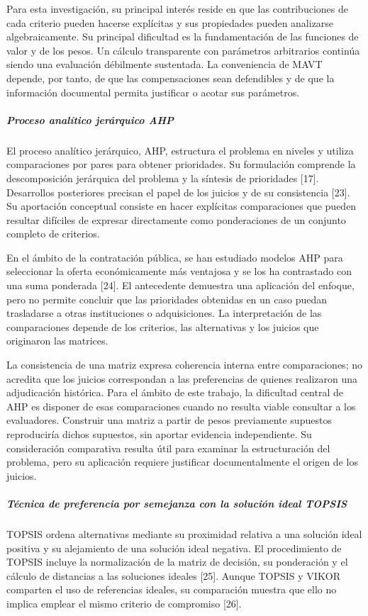 \documentclass[12pt,a4paper]{article}
\begin{document}
Para esta investigación, su principal interés reside en que las contribuciones de cada criterio pueden hacerse explícitas y sus propiedades pueden analizarse algebraicamente. Su principal dificultad es la fundamentación de las funciones de valor y de los pesos. Un cálculo transparente con parámetros arbitrarios continúa siendo una evaluación débilmente sustentada. La conveniencia de MAVT depende, por tanto, de que las compensaciones sean defendibles y de que la información documental permita justificar o acotar sus parámetros.

\subparagraph{Proceso analítico jerárquico AHP}

El proceso analítico jerárquico, AHP, estructura el problema en niveles y utiliza comparaciones por pares para obtener prioridades. Su formulación comprende la descomposición jerárquica del problema y la síntesis de prioridades [17]. Desarrollos posteriores precisan el papel de los juicios y de su consistencia [23]. Su aportación conceptual consiste en hacer explícitas comparaciones que pueden resultar difíciles de expresar directamente como ponderaciones de un conjunto completo de criterios.

En el ámbito de la contratación pública, se han estudiado modelos AHP para seleccionar la oferta económicamente más ventajosa y se los ha contrastado con una suma ponderada [24]. El antecedente demuestra una aplicación del enfoque, pero no permite concluir que las prioridades obtenidas en un caso puedan trasladarse a otras instituciones o adquisiciones. La interpretación de las comparaciones depende de los criterios, las alternativas y los juicios que originaron las matrices.

La consistencia de una matriz expresa coherencia interna entre comparaciones; no acredita que los juicios correspondan a las preferencias de quienes realizaron una adjudicación histórica. Para el ámbito de este trabajo, la dificultad central de AHP es disponer de esas comparaciones cuando no resulta viable consultar a los evaluadores. Construir una matriz a partir de pesos previamente supuestos reproduciría dichos supuestos, sin aportar evidencia independiente. Su consideración comparativa resulta útil para examinar la estructuración del problema, pero su aplicación requiere justificar documentalmente el origen de los juicios.

\subparagraph{Técnica de preferencia por semejanza con la solución ideal TOPSIS}

TOPSIS ordena alternativas mediante su proximidad relativa a una solución ideal positiva y su alejamiento de una solución ideal negativa. El procedimiento de TOPSIS incluye la normalización de la matriz de decisión, su ponderación y el cálculo de distancias a las soluciones ideales [25]. Aunque TOPSIS y VIKOR comparten el uso de referencias ideales, su comparación muestra que ello no implica emplear el mismo criterio de compromiso [26].
\end{document}
